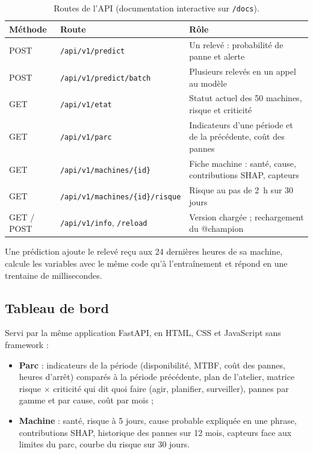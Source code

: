 \documentclass[11pt,a4paper]{article}
\newcommand{\entete}{}
\newcommand{\var}[1]{\texttt{#1}}
\begin{document}
\begin{table}[H]
\centering\small
\begin{tabular}{@{}lL{5.4cm}L{8cm}@{}}
\toprule
\entete \textbf{Méthode} & \textbf{Route} & \textbf{Rôle} \\
\midrule
POST & \var{/api/v1/predict} & Un relevé : probabilité de panne et alerte \\
POST & \var{/api/v1/predict/batch} & Plusieurs relevés en un appel au modèle \\
GET & \var{/api/v1/etat} & Statut actuel des 50 machines, risque et criticité \\
GET & \var{/api/v1/parc} & Indicateurs d'une période et de la précédente, coût des pannes \\
GET & \var{/api/v1/machines/\{id\}} & Fiche machine : santé, cause, contributions SHAP, capteurs \\
GET & \var{/api/v1/machines/\{id\}/risque} & Risque au pas de 2~h sur 30 jours \\
GET / POST & \var{/api/v1/info}, \var{/reload} & Version chargée ; rechargement du @champion \\
\bottomrule
\end{tabular}
\caption{Routes de l'API (documentation interactive sur \var{/docs}).}
\end{table}

Une prédiction ajoute le relevé reçu aux 24 dernières heures de sa machine, calcule les variables avec le même code
qu'à l'entraînement et répond en une trentaine de millisecondes.

\subsection{Tableau de bord}

Servi par la même application FastAPI, en HTML, CSS et JavaScript sans framework :
\begin{itemize}
  \item \textbf{Parc} : indicateurs de la période (disponibilité, MTBF, coût des pannes, heures d'arrêt) comparés à la
        période précédente, plan de l'atelier, matrice risque $\times$ criticité qui dit quoi faire (agir, planifier,
        surveiller), pannes par gamme et par cause, coût par mois ;
  \item \textbf{Machine} : santé, risque à 5 jours, cause probable expliquée en une phrase, contributions SHAP,
        historique des pannes sur 12 mois, capteurs face aux limites du parc, courbe du risque sur 30 jours.
\end{itemize}
\end{document}

